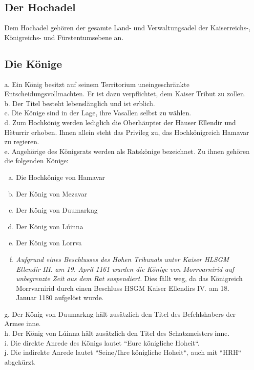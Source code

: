\documentclass{article}
\begin{document}
\subsection{Der Hochadel}
Dem Hochadel gehören der gesamte Land- und Verwaltungsadel der Kaiserreichs-, Königreichs- und Fürstentumsebene an.

\subsection{Die Könige}\label{koenige} 
a. Ein König besitzt auf seinem Territorium uneingeschränkte Entscheidungsvollmachten. Er ist dazu verpflichtet, dem Kaiser Tribut zu zollen.  \\
b. Der Titel besteht lebenslänglich und ist erblich.  \\
c. Die Könige sind in der Lage, ihre Vasallen selbst zu wählen.  \\
d. Zum Hochkönig werden lediglich die Oberhäupter der Häuser Ellendir und Hèturrir erhoben. Ihnen allein steht das Privileg zu, das Hochkönigreich Hamavar zu regieren.\\
e. Angehörige des Königsrats werden als Ratskönige bezeichnet. Zu ihnen gehören die folgenden Könige:  \\
\begin{enumerate}[a)]
\item Die Hochkönige von Hamavar  
\item Der König von Mezavar  
\item Der König von Duumarkng  
\item Der König von Lúinna  
\item Der König von Lorrva  
\item \textit{Aufgrund eines Beschlusses des Hohen Tribunals unter Kaiser HLSGM Ellendir III. am 19. April 1161 wurden die Könige von Morrvarnirid auf unbegrenzte Zeit aus dem Rat suspendiert.} Dies fällt weg, da das Königreich Morrvarnirid durch einen Beschluss HSGM Kaiser Ellendirs IV. am 18. Januar 1180 aufgelöst wurde.
\end{enumerate}
g. Der König von Duumarkng hält zusätzlich den Titel des Befehlshabers der Armee inne.  \\
h. Der König von Lúinna hält zusätzlich den Titel des Schatzmeisters inne.  \\
i. Die direkte Anrede des Königs lautet ``Eure königliche Hoheit``.  \\
j. Die indirekte Anrede lautet ``Seine/Ihre königliche Hoheit``, auch mit ``HRH`` abgekürzt.
\end{document}
